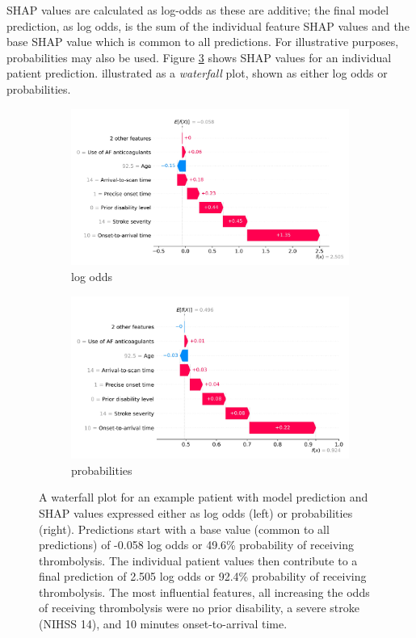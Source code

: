 SHAP values are calculated as log-odds as these are additive; the final model prediction, as log odds, is the sum of the individual feature SHAP values and the base SHAP value which is common to all predictions. For illustrative purposes, probabilities may also be used. Figure \ref{fig:waterfall} shows SHAP values for an individual patient prediction. illustrated as a \textit{waterfall} plot, shown as either log odds or probabilities.


\begin{figure}
    \centering
    \begin{subfigure}[b]{0.48\textwidth}
        \centering
        \includegraphics[width=\textwidth]{images/p2_waterfall_odds.jpg}
        \caption{log odds}
        \label{fig:waterfall_subfig1}
    \end{subfigure}
    \hfill
    \begin{subfigure}[b]{0.48\textwidth}
        \centering
        \includegraphics[width=\textwidth]{images/p2_waterfall_probs.jpg}
        \caption{probabilities}
        \label{fig:waterfall_subfig2}
    \end{subfigure}
    \caption{A waterfall plot for an example patient with model prediction and SHAP values expressed either as log odds (left) or probabilities (right). Predictions start with a base value (common to all predictions) of -0.058 log odds or 49.6\% probability of receiving thrombolysis. The individual patient values then contribute to a final prediction of 2.505 log odds or 92.4\% probability of receiving thrombolysis. The most influential features, all increasing the odds of receiving thrombolysis were no prior disability, a severe stroke (NIHSS 14), and 10 minutes onset-to-arrival time.}
    \label{fig:waterfall}
\end{figure}

